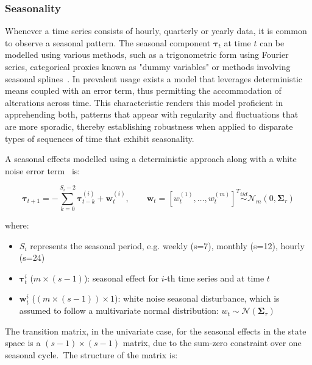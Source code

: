 \subsubsection{Seasonality}
    \label{sec:seasonality_component}

    Whenever a time series consists of hourly, quarterly or yearly data, it is common to observe a seasonal pattern.
    The seasonal component $\bm{\tau}_{t}$ at time $t$ can be modelled using various methods,
    such as a trigonometric form using Fourier series, categorical proxies known as "dummy variables"
    or methods involving seasonal splines~\cite{proietti_seasonality_2023}.
    In prevalent usage exists a model that leverages deterministic means coupled with an error term,
    thus permitting the accommodation of alterations across time.
    This characteristic renders this model proficient in apprehending both,
    patterns that appear with regularity and fluctuations that are more sporadic,
    thereby establishing robustness when applied to disparate types of sequences of time that exhibit seasonality.

    A seasonal effects modelled using a deterministic approach along with a white noise error term~\cite{qiu_multivariate_2018} is:

    \begin{equation}
        \bm{\tau}_{t+1} = - \sum_{k=0}^{S_{i}-2} \bm{\tau}_{t-k}^{(i)} + \bm{w}_{t}^{(i)},
            \qquad \bm{w}_{t} = [w_{t}^{(1)}, \ldots, w_{t}^{(m)}]^{T}
            \stackrel{\textit{iid}}{\sim} \mathcal{N}_{m}(0, \bm{\Sigma}_{\tau})
        \label{eq:seasonal}
    \end{equation}

    where:
    \begin{itemize}
        \item $S_{i}$ represents the seasonal period, e.g. weekly (s=7), monthly (s=12), hourly (s=24)
        \item $\bm{\tau}_{t}^{i}$ ($m \times (s-1)$): seasonal effect for $i$-th time series and at time $t$
        \item $\bm{w}_{t}^{i}$ ($(m \times (s-1)) \times 1$): white noise seasonal disturbance,
            which is assumed to follow a multivariate normal distribution: $w_{t} \sim \mathcal{N}(\bm{\Sigma}_{\tau})$
    \end{itemize}

    The transition matrix, in the univariate case, for the seasonal effects in the state space is a $(s-1) \times (s-1)$ matrix,
    due to the sum-zero constraint over one seasonal cycle.\ The structure of the matrix is:

